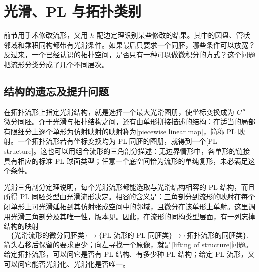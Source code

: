
% 
% 
% 
% 
% 
% 

\section{光滑、PL 与拓扑类别}
\label{g2:sec:2304}

前节用手术修改流形，又用 \(h\) 配边定理识别某些修改的结果。其中的圆盘、管状邻域和乘积同构都带有光滑条件。如果最后只要求一个同胚，哪些条件可以放宽？反过来，一个已经认识的拓扑空间，是否只有一种可以做微积分的方式？这个问题把流形分类分成了几个不同层次。

\subsection{结构的遗忘及提升问题}
\label{g2:subsec:2304:01}
在拓扑流形上指定光滑结构，就是选择一个最大光滑图册，使坐标变换成为 \(C^\infty\) 微分同胚。介于光滑与拓扑结构之间，还有由单形拼接描述的结构：在适当的局部有限细分上逐个单形为仿射映射的映射称为[piecewise linear map]，简称 PL 映射。一个拓扑流形若有坐标变换均为 PL 同胚的图册，就得到一个[PL structure]。这也可以用组合流形的三角剖分描述：无边界情形中，各单形的链接具有相应的标准 PL 球面类型；任意一个底空间恰为流形的单纯复形，未必满足这个条件。

\ProseParagraphBreak

光滑三角剖分定理说明，每个光滑流形都能选取与光滑结构相容的 PL 结构，而且所得 PL 同胚类型由光滑流形决定。相容的含义是：三角剖分到流形的映射在每个闭单形上可光滑延拓到其仿射张成空间中的邻域，且微分在该单形上单射。这里调用光滑三角剖分及其唯一性，版本见\cite[Essay I，第5节，第37--39页]{KirbySiebenmann1977}。因此，在流形的同构类型层面，有一列忘掉结构的映射
\[
	\{\text{光滑流形的微分同胚类}\}
	\longrightarrow\{\text{PL 流形的 PL 同胚类}\}
	\longrightarrow\{\text{拓扑流形的同胚类}\}.
\]
箭头右移后保留的要求更少；向左寻找一个原像，就是[lifting of structure]问题。给定拓扑流形，可以问它是否有 PL 结构、有多少种 PL 结构；给定 PL 流形，又可以问它能否光滑化、光滑化是否唯一。

